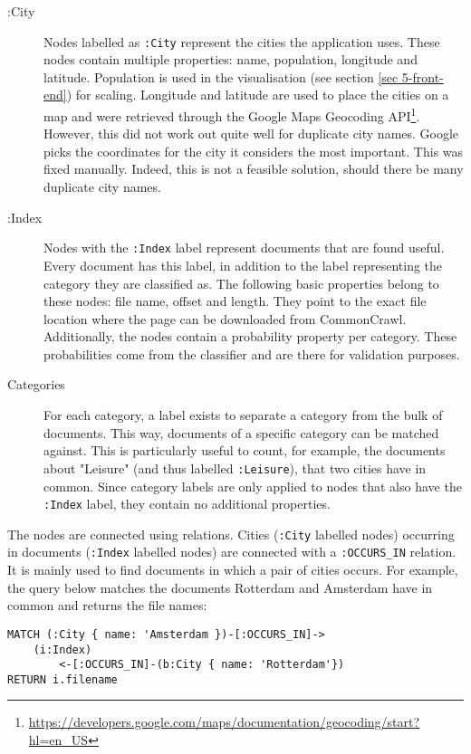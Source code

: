 \begin{description}
\item[:City] Nodes labelled as \texttt{:City} represent the cities the application uses. These nodes contain multiple properties: name, population, longitude and latitude. Population is used in the visualisation (see section \ref{sec 5-front-end}) for scaling. Longitude and latitude are used to place the cities on a map and were retrieved through the Google Maps Geocoding API\footnote{\url{https://developers.google.com/maps/documentation/geocoding/start?hl=en_US}}. However, this did not work out quite well for duplicate city names. Google picks the coordinates for the city it considers the most important. This was fixed manually. Indeed, this is not a feasible solution, should there be many duplicate city names.
\item[:Index] Nodes with the \texttt{:Index} label represent documents that are found useful. Every document has this label, in addition to the label representing the category they are classified as. The following basic properties belong to these nodes: file name, offset and length. They point to the exact file location where the page can be downloaded from CommonCrawl. Additionally, the nodes contain a probability property per category. These probabilities come from the classifier and are there for validation purposes.
\item[Categories] For each category, a label exists to separate a category from the bulk of documents. This way, documents of a specific category can be matched against. This is particularly useful to count, for example, the documents about "Leisure" (and thus labelled \texttt{:Leisure}), that two cities have in common. Since category labels are only applied to nodes that also have the \texttt{:Index} label, they contain no additional properties.
\end{description}

The nodes are connected using relations. Cities (\texttt{:City} labelled nodes) occurring in documents (\texttt{:Index} labelled nodes) are connected with a \texttt{:OCCURS\_IN} relation. It is mainly used to find documents in which a pair of cities occurs. For example, the query below matches the documents Rotterdam and Amsterdam have in common and returns the file names:

\begin{lstlisting}[language=cypher, caption={Querying documents containing two cities}, label={lst:query-occ}]
MATCH (:City { name: 'Amsterdam })-[:OCCURS_IN]->
    (i:Index)
        <-[:OCCURS_IN]-(b:City { name: 'Rotterdam'})
RETURN i.filename
\end{lstlisting}

